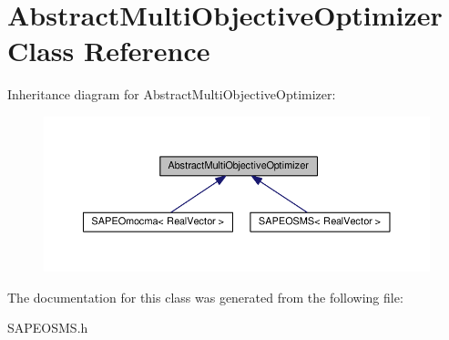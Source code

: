 \hypertarget{classAbstractMultiObjectiveOptimizer}{}\section{Abstract\+Multi\+Objective\+Optimizer Class Reference}
\label{classAbstractMultiObjectiveOptimizer}


Inheritance diagram for Abstract\+Multi\+Objective\+Optimizer\+:\nopagebreak
\begin{figure}[H]
\begin{center}
\leavevmode
\includegraphics[width=350pt]{classAbstractMultiObjectiveOptimizer__inherit__graph}
\end{center}
\end{figure}


The documentation for this class was generated from the following file\+:\begin{DoxyCompactItemize}
\item 
S\+A\+P\+E\+O\+S\+M\+S.\+h\end{DoxyCompactItemize}
